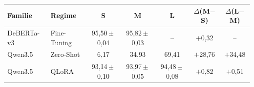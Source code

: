 \begin{tabular}{llccccc}
    \toprule
    \textbf{Familie} & \textbf{Regime} & \textbf{S} & \textbf{M} &
    \textbf{L} & $\Delta$(M$-$S) & $\Delta$(L$-$M) \\
    \midrule
    DeBERTa-v3 & Fine-Tuning & 95,50\,$\pm$\,0,04 & 95,82\,$\pm$\,0,03 & -- & $+$0,32 & -- \\
    Qwen3.5 & Zero-Shot & 6,17 & 34,93 & 69,41 & $+$28,76 & $+$34,48 \\
    Qwen3.5 & QLoRA & 93,14\,$\pm$\,0,10 & 93,97\,$\pm$\,0,05 & 94,48\,$\pm$\,0,08 & $+$0,82 & $+$0,51 \\
    \bottomrule
\end{tabular}
